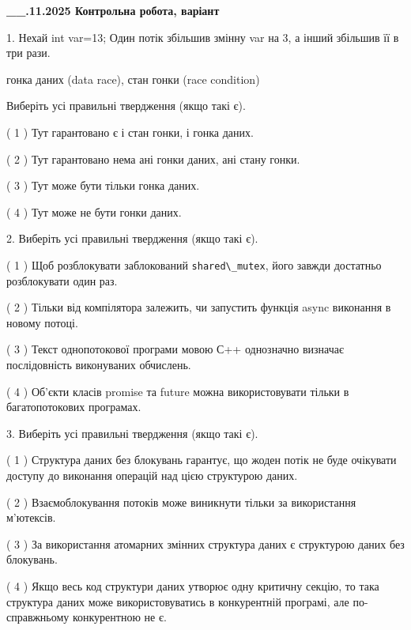 \documentclass[12pt, ukrainian]{article}
\def\code#1{\Verb!#1!}
\begin{document}
\newpage
\begin {large}

\textbf{\_\_.11.2025 Контрольна робота, варіант  }\par


{
1. Нехай int var=13; Один потік збільшив змінну var на 3, а інший збільшив її в три рази.

гонка даних (data race), стан гонки (race condition)

Виберіть усі правильні твердження (якщо такі є).\par
\vspace{2mm}
( 1 ) Тут гарантовано є і стан гонки, і гонка даних.%

( 2 ) Тут гарантовано нема ані гонки даних, ані стану гонки.%

( 3 ) Тут може бути тільки гонка даних.%

( 4 ) Тут може не бути гонки даних.%


2. Виберіть усі правильні твердження (якщо такі є).\par

( 1 ) Щоб розблокувати заблокований \code{shared\_mutex}, його завжди достатньо розблокувати один раз.%

( 2 ) Тільки від компілятора залежить, чи запустить функція async виконання в новому потоці.%

( 3 ) Текст однопотокової програми мовою С++ однозначно визначає послідовність виконуваних обчислень.%

( 4 ) Об’єкти класів promise та future можна використовувати тільки в багатопотокових програмах.%


3. Виберіть усі правильні твердження (якщо такі є).\par
\vspace{2mm}

( 1 ) Структура даних без блокувань гарантує, що жоден потік не буде очікувати доступу до виконання операцій над цією структурою даних.%

( 2 ) Взаємоблокування потоків може виникнути тільки за використання м’ютексів.%

( 3 ) За використання атомарних змінних структура даних є структурою даних без блокувань.%

( 4 ) Якщо весь код структури даних утворює одну критичну секцію, то така структура даних може використовуватись в конкурентній програмі, але по-справжньо\-му конкурентною не є.%


}
\end{large}
\end{document}
